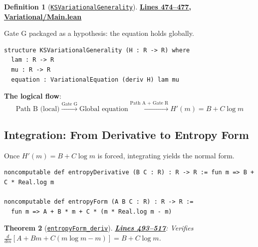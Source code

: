 \documentclass[11pt]{article}
\newtheorem{theorem}{Theorem}[section]
\theoremstyle{definition}
\newtheorem{definition}[theorem]{Definition}
\theoremstyle{remark}
\begin{document}
\begin{definition}[\href{https://github.com/zariuq/ks-foundations-of-inference/blob/main/KnuthSkilling/Variational/Main.lean\#L475}{\texttt{KSVariationalGenerality}}]
\textbf{\href{https://github.com/zariuq/ks-foundations-of-inference/blob/main/KnuthSkilling/Variational/Main.lean\#L474-L477}{Lines 474--477, Variational/Main.lean}}

Gate G packaged as a hypothesis: the equation holds globally.
\end{definition}

\begin{lstlisting}[caption={Gate G: explicit globality hypothesis},firstnumber=474]
structure KSVariationalGenerality (H : R -> R) where
  lam : R -> R
  mu : R -> R
  equation : VariationalEquation (deriv H) lam mu
\end{lstlisting}

\textbf{The logical flow}:
\[
\text{Path B (local)} \xrightarrow{\text{Gate G}} \text{Global equation} \xrightarrow{\text{Path A + Gate R}} H'(m) = B + C \log m
\]

\subsection{Integration: From Derivative to Entropy Form}

Once $H'(m) = B + C \log m$ is forced, integrating yields the normal form.

\begin{lstlisting}[caption={Entropy derivative and form (\href{https://github.com/zariuq/ks-foundations-of-inference/blob/main/KnuthSkilling/Variational/Main.lean\#L292}{lines 292}, \href{https://github.com/zariuq/ks-foundations-of-inference/blob/main/KnuthSkilling/Variational/Main.lean\#L491}{491})},firstnumber=292]
noncomputable def entropyDerivative (B C : R) : R -> R := fun m => B + C * Real.log m

noncomputable def entropyForm (A B C : R) : R -> R :=
  fun m => A + B * m + C * (m * Real.log m - m)
\end{lstlisting}

\begin{theorem}[\href{https://github.com/zariuq/ks-foundations-of-inference/blob/main/KnuthSkilling/Variational/Main.lean\#L494}{\texttt{entropyForm\_deriv}}]
\textbf{\href{https://github.com/zariuq/ks-foundations-of-inference/blob/main/KnuthSkilling/Variational/Main.lean\#L493-L517}{Lines 493--517}}: Verifies $\frac{d}{dm}[A + Bm + C(m \log m - m)] = B + C \log m$.
\end{theorem}
\end{document}
